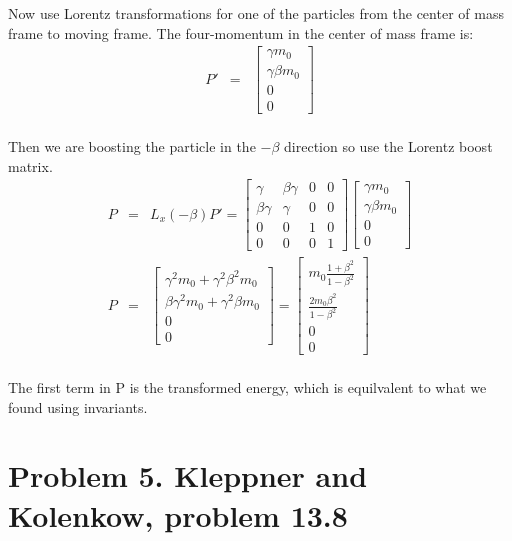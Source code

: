 \documentclass[11pt]{amsart}
\begin{document}
Now use Lorentz transformations for one of the particles from the center of mass frame to moving frame. The four-momentum in the center of mass frame is: \\
\begin{eqnarray*} 
P' &=& \begin{bmatrix}
	\gamma{m_{0}} \\
	\gamma\beta{m_{0}} \\
	0 \\
	0 
	\end{bmatrix}
\end{eqnarray*} \\
Then we are boosting the particle in the $-\beta$ direction so use the Lorentz boost matrix. \\
\begin{eqnarray*}
P &=& L_{x}(-\beta)P' =\begin{bmatrix}
	\gamma & \beta\gamma & 0 & 0 \\
	\beta\gamma & \gamma & 0 & 0 \\
	0 & 0 & 1 & 0 \\
	0 & 0 & 0 & 1 
	\end{bmatrix}\begin{bmatrix}
	\gamma{m_{0}} \\
	\gamma\beta{m_{0}} \\
	0 \\
	0 
	\end{bmatrix} \\
P &=& \begin{bmatrix}
	\gamma^{2}m_{0}+\gamma^{2}\beta^{2}m_{0} \\
	\beta\gamma^{2}m_{0}+\gamma^{2}\beta{m_{0}} \\
	0 \\
	0 
	\end{bmatrix} = \begin{bmatrix}
	m_{0}\frac{1+\beta^{2}}{1-\beta^{2}} \\
	\frac{2m_{0}\beta^{2}}{1-\beta^{2}} \\
	0 \\
	0 
	\end{bmatrix}
	\end{eqnarray*} \\
The first term in P is the transformed energy, which is equilvalent to what we found using invariants. \\

\section*{Problem 5. Kleppner and Kolenkow, problem 13.8}
\end{document}

